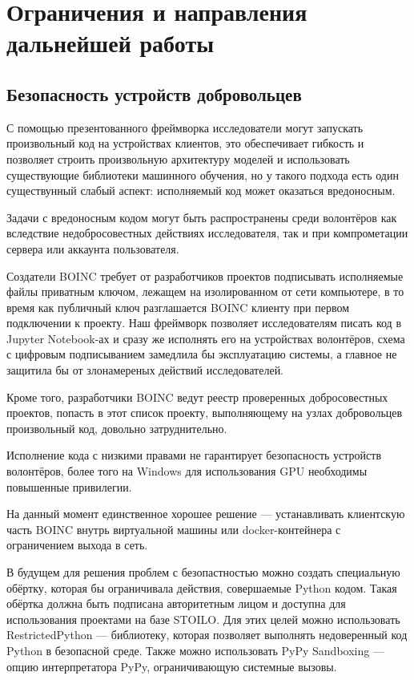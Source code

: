 \documentclass[a4paper,12pt]{extarticle}
\begin{document}
\section{Ограничения и направления дальнейшей работы}

\subsection{Безопасность устройств добровольцев}

С помощью презентованного фреймворка исследователи могут запускать произвольный код на устройствах клиентов, это обеспечивает гибкость и позволяет строить произвольную архитектуру моделей и использовать существующие библиотеки машинного обучения, но у такого подхода есть один существунный слабый аспект: исполняемый код может оказаться вредоносным.

Задачи с вредоносным кодом могут быть распространены среди волонтёров как вследствие недобросовестных действиях исследователя, так и при компрометации сервера или аккаунта пользователя.

Создатели BOINC требует от разработчиков проектов подписывать исполняемые файлы приватным ключом, лежащем на изолированном от сети компьютере, в то время как публичный ключ разглашается BOINC клиенту при первом подключении к проекту.
Наш фреймворк позволяет исследователям писать код в Jupyter Notebook-ах и сразу же исполнять его на устройствах волонтёров, схема с цифровым подписыванием замедлила бы эксплуатацию системы, а главное не защитила бы от злонамереных действий исследователей.

Кроме того, разработчики BOINC ведут реестр проверенных добросовестных проектов, попасть в этот список проекту, выполняющему на узлах добровольцев произвольный код, довольно затруднительно.

Исполнение кода с низкими правами не гарантирует безопасность устройств волонтёров, более того на Windows для использования GPU необходимы повышенные привилегии.

На данный момент единственное хорошее решение — устанавливать клиентскую часть BOINC внутрь виртуальной машины или docker-контейнера с ограничением выхода в сеть.

В будущем для решения проблем с безопастностью можно создать специальную обёртку, которая бы ограничивала действия, совершаемые Python кодом. Такая обёртка должна быть подписана авторитетным лицом и доступна для использования проектами на базе STOILO.
Для этих целей можно использовать RestrictedPython — библиотеку, которая позволяет выполнять недоверенный код Python в безопасной среде. Также можно использовать PyPy Sandboxing — опцию интерпретатора PyPy, ограничивающую системные вызовы.
\end{document}
